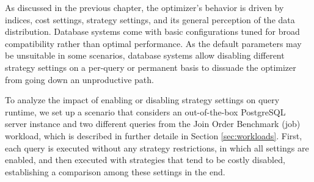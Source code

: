 \label{sec:preliminary_experiments}

As discussed in the previous chapter, the optimizer’s behavior is driven by indices, cost settings, strategy settings, and its general perception of the data distribution. Database systems come with basic configurations tuned for broad compatibility rather than optimal performance. As the default parameters may be unsuitable in some scenarios, database systems allow disabling different strategy settings on a per-query or permanent basis to dissuade the optimizer from going down an unproductive path.

To analyze the impact of enabling or disabling strategy settings on query runtime, we set up a scenario that considers an out-of-the-box PostgreSQL~\citep{PostGreSQL} server instance and two different queries from the Join Order Benchmark (\gls{job})~\citep{JOB} workload, which is described in further detaile in Section \ref{sec:workloads}. First, each query is executed without any strategy restrictions, in which all settings are enabled, and then executed with strategies that tend to be costly disabled, establishing a comparison among these settings in the end.

